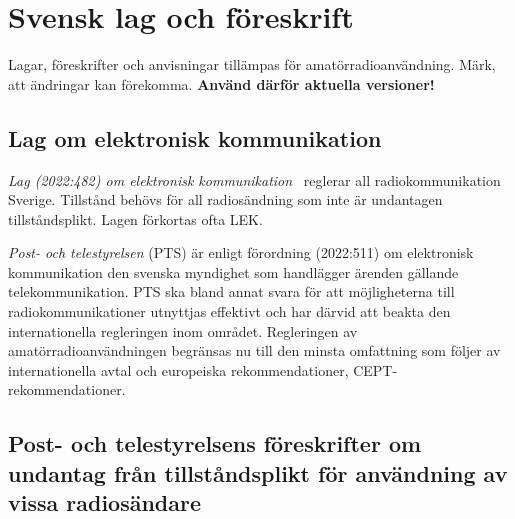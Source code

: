 \section{Svensk lag och föreskrift}
\label{svensk lag och föreskrift}

Lagar, föreskrifter och anvisningar tillämpas för
  amatörradioanvändning.
Märk, att ändringar kan förekomma.
\textbf{Använd därför aktuella versioner!}


\subsection{Lag om elektronisk kommunikation}

\emph{Lag (2022:482) om elektronisk kommunikation}~\cite{SFS2022:482} reglerar
all radiokommunikation Sverige.
Tillstånd behövs för all radiosändning som inte är undantagen tillståndsplikt.
Lagen förkortas ofta LEK.

\emph{Post- och telestyrelsen} (PTS) är enligt förordning (2022:511) om
elektronisk kommunikation den svenska myndighet som handlägger ärenden gällande
telekommunikation.
PTS ska bland annat svara för att möjligheterna till radiokommunikationer
utnyttjas effektivt och har därvid att beakta den internationella regleringen
inom området.
Regleringen av amatörradioanvändningen begränsas nu till den minsta omfattning
som följer av internationella avtal och europeiska rekommendationer,
CEPT-rekommendationer.

\newpage %
\subsection{Post- och telestyrelsens föreskrifter om undantag från tillståndsplikt för användning av vissa radiosändare}
\label{PTSFS2022:19}

